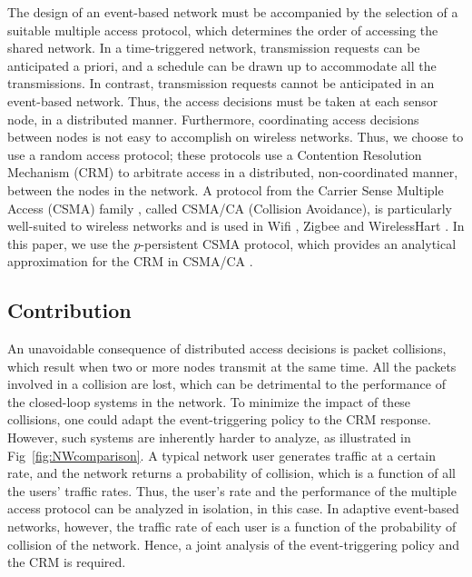 \documentclass[journal]{IEEEtran}
\begin{document}
The design of an event-based network must be accompanied by the selection of a suitable multiple access protocol, which determines the order of accessing the shared network. In a time-triggered network, transmission requests can be anticipated a priori, and a schedule can be drawn up to accommodate all the transmissions. In contrast, transmission requests cannot be anticipated in an event-based network. Thus, the access decisions must be taken at each sensor node, in a distributed manner. Furthermore, coordinating access decisions between nodes is not easy to accomplish on wireless networks. Thus, we choose to use a random access protocol; these protocols use a Contention Resolution Mechanism (CRM) to arbitrate access in a distributed, non-coordinated manner, between the nodes in the network. A protocol from the Carrier Sense Multiple Access (CSMA) family \cite{Rom1990}, called CSMA/CA (Collision Avoidance), is particularly well-suited to wireless networks and is used in Wifi \cite{ieee80211}, Zigbee \cite{zigbee} and WirelessHart \cite{WirelessHART2007}. In this paper, we use the $p$-persistent CSMA protocol, which provides an analytical approximation for the CRM in CSMA/CA \cite{Kleinrock1975}.

\subsection{Contribution}

An unavoidable consequence of distributed access decisions is packet collisions, which result when two or more nodes transmit at the same time. All the packets involved in a collision are lost, which can be detrimental to the performance of the closed-loop systems in the network. To minimize the impact of these collisions, one could adapt the event-triggering policy to the CRM response. However, such systems are inherently harder to analyze, as illustrated in Fig~\ref{fig:NWcomparison}. A typical network user generates traffic at a certain rate, and the network returns a probability of collision, which is a function of all the users' traffic rates. Thus, the user's rate and the performance of the multiple access protocol can be analyzed in isolation, in this case. In adaptive event-based networks, however, the traffic rate of each user is a function of the probability of collision of the network. Hence, a joint analysis of the event-triggering policy and the CRM is required.
\end{document}
